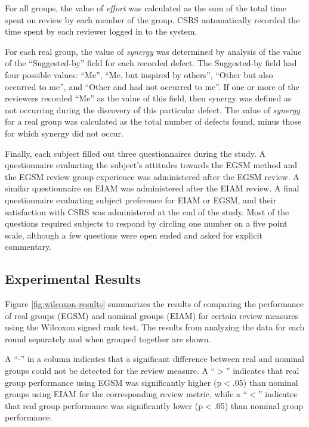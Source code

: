For all groups, the value of {\em effort} was calculated
as the sum of the total time spent on review by each member of the group. 
CSRS automatically recorded the time spent by each reviewer logged in to
the system. 

For each real group, the value of {\em synergy} was determined by analysis
of the value of the ``Suggested-by'' field for each recorded defect. The
Suggested-by field had four possible values: ``Me'', ``Me, but inspired by
others'', ``Other but also occurred to me'', and ``Other and had not
occurred to me''.  If one or more of the reviewers recorded ``Me'' as the
value of this field, then synergy was defined as not occurring during the
discovery of this particular defect. The value of {\em synergy} for 
a real group was calculated as the total number of defects found, minus
those for which synergy did not occur. 

Finally, each subject filled out three questionnaires during the study.  A
questionnaire evaluating the subject's attitudes towards the EGSM method
and the EGSM review group experience was administered after the EGSM
review. A similar questionnaire on EIAM was administered after the EIAM
review. A final questionnaire evaluating subject preference for EIAM or
EGSM, and their satisfaction with CSRS was administered at the end of the
study.  Most of the questions required subjects to respond by circling
one number on a five point scale, although a few questions were open ended
and asked for explicit commentary. 


\subsection{Experimental Results}

Figure \ref{fig:wilcoxon-results} summarizes the results of comparing the
performance of real groups (EGSM) and nominal groups (EIAM) for certain
review measures using the Wilcoxon signed rank test.  The results
from analyzing the data for each round separately and when grouped
together are shown.

A ``-'' in a column indicates that a significant difference between real
and nominal groups could not be detected for the review measure. A ``$>$''
indicates that real group performance using EGSM was significantly higher
(p$<$.05) than nominal groups using EIAM for the corresponding review
metric, while a ``$<$'' indicates that real group performance was
significantly lower (p$<$.05) than nominal group performance.


